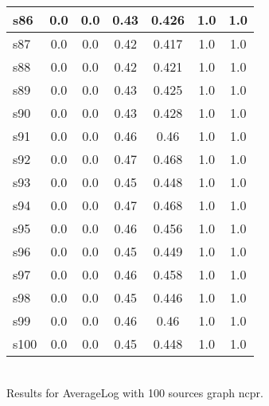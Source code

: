 \documentclass{article}
\begin{document}
\begin{tabular}{|l|c|c|c|c|c|c|}
\hline
s86 &0.0 & 0.0 & 0.43 & 0.426 & 1.0 & 1.0\\
\hline
s87 &0.0 & 0.0 & 0.42 & 0.417 & 1.0 & 1.0\\
\hline
s88 &0.0 & 0.0 & 0.42 & 0.421 & 1.0 & 1.0\\
\hline
s89 &0.0 & 0.0 & 0.43 & 0.425 & 1.0 & 1.0\\
\hline
s90 &0.0 & 0.0 & 0.43 & 0.428 & 1.0 & 1.0\\
\hline
s91 &0.0 & 0.0 & 0.46 & 0.46 & 1.0 & 1.0\\
\hline
s92 &0.0 & 0.0 & 0.47 & 0.468 & 1.0 & 1.0\\
\hline
s93 &0.0 & 0.0 & 0.45 & 0.448 & 1.0 & 1.0\\
\hline
s94 &0.0 & 0.0 & 0.47 & 0.468 & 1.0 & 1.0\\
\hline
s95 &0.0 & 0.0 & 0.46 & 0.456 & 1.0 & 1.0\\
\hline
s96 &0.0 & 0.0 & 0.45 & 0.449 & 1.0 & 1.0\\
\hline
s97 &0.0 & 0.0 & 0.46 & 0.458 & 1.0 & 1.0\\
\hline
s98 &0.0 & 0.0 & 0.45 & 0.446 & 1.0 & 1.0\\
\hline
s99 &0.0 & 0.0 & 0.46 & 0.46 & 1.0 & 1.0\\
\hline
s100 &0.0 & 0.0 & 0.45 & 0.448 & 1.0 & 1.0\\
\hline
\end{tabular}\\

\noindent Results for AverageLog with 100 sources graph ncpr.
\end{document}
